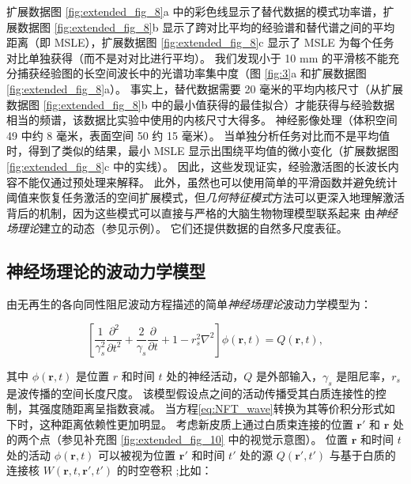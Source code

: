 \documentclass[lang=cn,a4paper,newtx,citestyle=gb7714-2015, bibstyle=gb7714-2015]{elegantpaper}
\begin{document}
扩展数据图 \ref{fig:extended_fig_8}a 中的彩色线显示了替代数据的模式功率谱，扩展数据图 \ref{fig:extended_fig_8}b 显示了跨对比平均的经验谱和替代谱之间的平均距离（即 MSLE），扩展数据图 \ref{fig:extended_fig_8}c 显示了 MSLE 为每个任务对比单独获得（而不是对对比进行平均）。
我们发现小于 10 mm 的平滑核不能充分捕获经验图的长空间波长中的光谱功率集中度（图 \ref{fig:3}a 和扩展数据图 \ref{fig:extended_fig_8}a）。
事实上，替代数据需要 20 毫米的平均内核尺寸（从扩展数据图 \ref{fig:extended_fig_8}b 中的最小值获得的最佳拟合）才能获得与经验数据相当的频谱，该数据比实验中使用的内核尺寸大得多。
神经影像处理（体积空间 49 中约 8 毫米，表面空间 50 约 15 毫米）。
当单独分析任务对比而不是平均值时，得到了类似的结果，最小 MSLE 显示出围绕平均值的微小变化（扩展数据图 \ref{fig:extended_fig_8}c 中的实线）。
因此，这些发现证实，经验激活图的长波长内容不能仅通过预处理来解释。
此外，虽然也可以使用简单的平滑函数并避免统计阈值来恢复任务激活的空间扩展模式，但\textit{几何特征模式}方法可以更深入地理解激活背后的机制，因为这些模式可以直接与严格的大脑生物物理模型联系起来 由\textit{神经场理论}建立的动态（参见示例\cite{robinson1997propagation,robinson2016eigenmodes,jones1999golgi,wang2016brain}）。
它们还提供数据的自然多尺度表征。



\subsection{神经场理论的波动力学模型} \label{sec:NFT_wave}

由无再生的各向同性阻尼波动方程描述的简单\textit{神经场理论}波动力学模型为：

\begin{equation}\label{eq:NFT_wave}
	[\frac{1}{\gamma_s^2} \frac{\partial ^2}{\partial t^2} +
	\frac{2}{\gamma_s} \frac{\partial}{\partial t} + 
	1 - r_s^2 \nabla^2
	]
	\phi(\boldsymbol{r}, t)
	= Q(\boldsymbol{r}, t),
\end{equation}


其中 $ \phi(\boldsymbol{r},t) $ 是位置 $ r $ 和时间 $ t $ 处的神经活动，$ Q $ 是外部输入，$ \gamma_s $ 是阻尼率，$ r_s $ 是波传播的空间长度尺度。
该模型假设点之间的活动传播受其白质连接性的控制，其强度随距离呈指数衰减。
当方程\ref{eq:NFT_wave}转换为其等价积分形式如下时，这种距离依赖性更加明显。
考虑新皮质上通过白质束连接的位置 $ \boldsymbol{r}' $ 和 $ \boldsymbol{r} $ 处的两个点（参见补充图 \ref{fig:extended_fig_10} 中的视觉示意图）。
位置 $ \boldsymbol{r} $ 和时间 $ t $ 处的活动 $ \phi(\boldsymbol{r},t) $ 可以被视为位置 $ \boldsymbol{r}' $ 和时间 $ t' $ 处的源 $ Q(\boldsymbol{r}',t') $ 与基于白质的连接核 $ W(\boldsymbol{r}, t, \boldsymbol{r}', t') $ 的时空卷积 ;比如：
\end{document}
